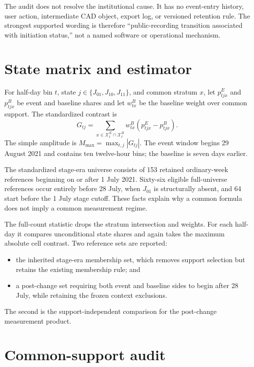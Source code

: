\documentclass[11pt]{article}
\begin{document}
The audit does not resolve the institutional cause. It has no event-entry history, user action, intermediate CAD object, export log, or versioned retention rule. The strongest supported wording is therefore ``public-recording transition associated with initiation status,'' not a named software or operational mechanism.

\section{State matrix and estimator}

For half-day bin $t$, state $j\in\{J_{01},J_{10},J_{11}\}$, and common stratum $x$, let $p^E_{tjx}$ and $p^B_{tjx}$ be event and baseline shares and let $w^B_{tx}$ be the baseline weight over common support. The standardized contrast is
\begin{equation}
G_{tj}=\sum_{x\in\mathcal X_t^E\cap\mathcal X_t^B}w^B_{tx}(p^E_{tjx}-p^B_{tjx}).
\end{equation}
The simple amplitude is $M_{\max}=\max_{t,j}|G_{tj}|$. The event window begins 29 August 2021 and contains ten twelve-hour bins; the baseline is seven days earlier.

The standardized stage-era universe consists of 153 retained ordinary-week references beginning on or after 1 July 2021. Sixty-six eligible full-universe references occur entirely before 28 July, when $J_{01}$ is structurally absent, and 64 start before the 1 July stage cutoff. These facts explain why a common formula does not imply a common measurement regime.

The full-count statistic drops the stratum intersection and weights. For each half-day it compares unconditional state shares and again takes the maximum absolute cell contrast. Two reference sets are reported:
\begin{itemize}
\item the inherited stage-era membership set, which removes support selection but retains the existing membership rule; and
\item a post-change set requiring both event and baseline sides to begin after 28 July, while retaining the frozen context exclusions.
\end{itemize}
The second is the support-independent comparison for the post-change measurement product.

\section{Common-support audit}
\end{document}

